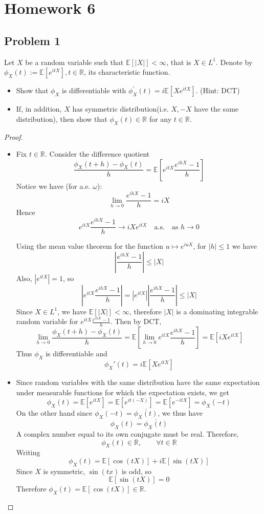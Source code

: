 \chapter*{Homework 6}
\section*{Problem 1}
Let $X$ be a random variable such that 
$\mathbb{E}\left[\left|X\right|\right]<\infty$, 
that is $X \in L^1$. 
Denote by $\phi_X(t):= \mathbb{E}\left[e^{i t X}\right], t \in \mathbb{R}$, 
its characteristic function.
\begin{itemize}
\item[(a)]
Show that $\phi_X$ is differentiable with 
$\phi_X^{\prime}(t)=i \mathbb{E}\left[X e^{i t X}\right]$. (Hint: DCT)

\item[(b)]
If, in addition, $X$ has symmetric distribution(i.e. $X,-X$ have the same distribution),
then show that $\phi_X(t) \in \mathbb{R}$ for any $t \in \mathbb{R}$.
\end{itemize}
\begin{proof}
\begin{itemize}
\item[(a)]
Fix $t \in \mathbb{R}$. Consider the difference quotient
\[
\frac{\phi_X(t+h)-\phi_X(t)}{h}
=
\mathbb{E}\left[
e^{itX}\frac{e^{ihX}-1}{h}
\right]
\]
Notice we have (for a.e. $\omega$): 
\[
\lim_{h\to 0}\frac{e^{ihX}-1}{h}=iX
\]
Hence
\[
e^{itX}\frac{e^{ihX}-1}{h}
\longrightarrow
iXe^{itX}
\quad \text{a.s.} \quad \text{as } h\to 0
\]

Using the mean value theorem for the function
$u \mapsto e^{iuX}$, for $|h|\le 1$ we have
\[
\left|\frac{e^{ihX}-1}{h}\right|
\le |X|
\]
Also, $|e^{itX}|=1$, so
\[
\left|
e^{itX}\frac{e^{ihX}-1}{h}
\right|
=
|e^{itX}|
\left|\frac{e^{ihX}-1}{h}\right|
\le |X|
\]
Since $X \in L^1$, we have $\mathbb{E}[|X|] < \infty$, therefore  $|X|$ 
is a dominating integrable random variable for $e^{itX}\frac{e^{ihX}-1}{h}$.
Then by DCT, 
\[
\lim_{h\to 0}\frac{\phi_X(t+h)-\phi_X(t)}{h}
=
\mathbb{E}\left[\lim_{h\to 0}
e^{itX}\frac{e^{ihX}-1}{h}\right]
=
\mathbb{E}[iXe^{itX}]
\]
Thus $\phi_X$ is differentiable and
\[
\phi_X'(t)=i\mathbb{E}[Xe^{itX}]
\]

\item[(b)]
Since random
variables with the same distribution 
have the same expectation under measurable functions for which the
expectation exists, we get
\[
\phi_X(t)=\mathbb{E}[e^{itX}]=\mathbb{E}[e^{it(-X)}]=\mathbb{E}[e^{-itX}]
=\phi_X(-t)
\]
On the other hand since 
\(
\phi_X(-t)=\overline{\phi_X(t)}
\), we thus have
\[
\phi_X(t)=\overline{\phi_X(t)}
\]
A complex number equal to its own conjugate must be real. Therefore,
\[
\phi_X(t)\in \mathbb{R}, \qquad \forall t\in\mathbb{R}
\]
Writing
\[
\phi_X(t)=\mathbb{E}[\cos(tX)]+i\mathbb{E}[\sin(tX)]
\]
Since $X$ is symmetric, $\sin(tx)$ is odd, so
\[
\mathbb{E}[\sin(tX)]=0
\]
Therefore $\phi_X(t)=\mathbb{E}[\cos(tX)] \in \mathbb{R}$.
\end{itemize}
\end{proof}



